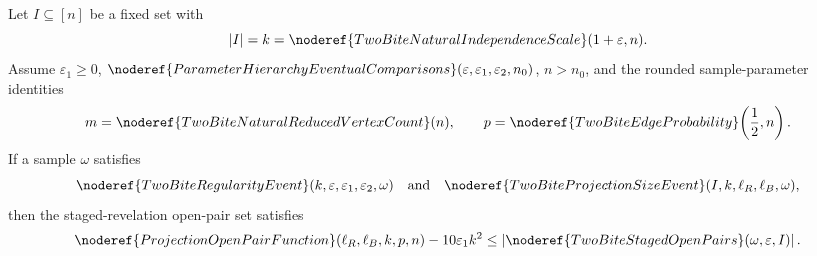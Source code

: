 \begin{lemma}
Let \(I\subseteq[n]\) be a fixed set with
\[
|I|=k=\noderef{TwoBiteNaturalIndependenceScale}(1+\varepsilon,n).
\]
Assume \(\varepsilon_1\ge0\),
\(\noderef{ParameterHierarchyEventualComparisons}
(\varepsilon,\varepsilon_1,\varepsilon_2,n_0)\), \(n>n_0\), and the rounded
sample-parameter identities
\[
m=\noderef{TwoBiteNaturalReducedVertexCount}(n),\qquad
p=\noderef{TwoBiteEdgeProbability}\!\left(\frac12,n\right).
\]
If a sample \(\omega\) satisfies
\[
\noderef{TwoBiteRegularityEvent}(k,\varepsilon,\varepsilon_1,\varepsilon_2,\omega)
\quad\text{and}\quad
\noderef{TwoBiteProjectionSizeEvent}(I,k,\ell_R,\ell_B,\omega),
\]
then the staged-revelation open-pair set satisfies
\[
\noderef{ProjectionOpenPairFunction}(\ell_R,\ell_B,k,p,n)
  -10\varepsilon_1 k^2
\le
\left|\noderef{TwoBiteStagedOpenPairs}(\omega,\varepsilon,I)\right|.
\]
\end{lemma}
